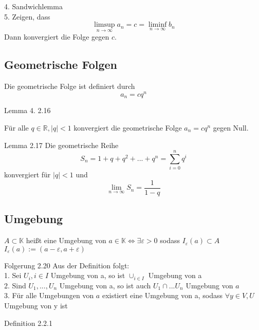 \documentclass[headsepline,12pt,a4paper]{scrartcl}
\begin{document}
4. Sandwichlemma \\
5. Zeigen, dass $$\limsup\limits_{n \rightarrow \infty} a_n = c = \liminf\limits_{n \rightarrow \infty} b_n$$ Dann konvergiert die Folge gegen $c$. \\

\subsection*{Geometrische Folgen }

Die geometrische Folge ist definiert durch 
$$ a_n = cq^n$$

\item[Lemma 4. 2.16] 

Für alle $q\in \mathbb{R}, |q| < 1$ konvergiert die geometrische Folge $a_n = cq^n$ gegen Null. \\

\item[Lemma 2.17]
Die geometrische Reihe 
$$ S_n= 1+q+q^2+...+q^n = \sum\limits_{i=0}^n q^{i} $$
konvergiert für $|q| < 1$ und $$\lim\limits_{n \rightarrow \infty} S_n = \frac{1}{1-q} $$

\newpage

\subsection*{Umgebung}

$A\subset \mathbb{K}$ heißt eine Umgebung von $a \in \mathbb{K} \Leftrightarrow \exists \varepsilon > 0 $ sodass $I_{\varepsilon}(a) \subset A$ \\
$I_{\varepsilon}(a) := (a-\varepsilon,a+\varepsilon) $

\item[Folgerung 2.20]
Aus der Definition folgt: \\

1. Sei $U_i, i \in I$ Umgebung von a, so ist $\cup_{i \in I}$ Umgebung von a \\

2. Sind $U_1,...,U_n$ Umgebung von a, so ist auch $U_1 \cap ... U_n$ Umgebung von $a$ \\

3. Für alle Umgebungen von $a$ existiert eine Umgebung von a, sodass $ \forall y \in V,U$ Umgebung von y ist \\

\item[Definition 2.2.1]
\end{document}
